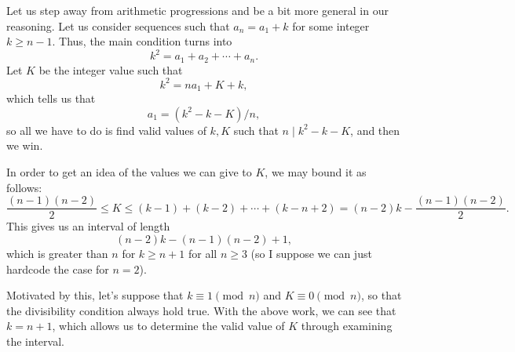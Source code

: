 \documentclass[a4paper, 12pt]{article}
\begin{document}
\begin{solution}
Let us step away from arithmetic progressions and be a bit more general in our reasoning. Let us consider sequences such that \( a_n = a_1 + k \) for some integer \( k \ge n - 1 \). Thus, the main condition turns into
\[
    k^2 = a_1 + a_2 + \cdots + a_n
.\]
Let \( K \) be the integer value such that
\[
    k^2 = n a_1 + K + k
,\]
which tells us that
\[
    a_1 = (k^2 - k - K) / n
,\]
so all we have to do is find valid values of \( k, K \) such that \( n \mid k^2 - k - K \), and then we win.

In order to get an idea of the values we can give to \( K \), we may bound it as follows:
\[
    \frac{(n-1)(n-2)}{2} \le K \le (k - 1) + (k - 2) + \cdots + (k - n + 2) = (n-2)k - \frac{(n-1)(n-2)}{2}
.\]
This gives us an interval of length
\[
    (n-2)k - (n-1)(n-2) + 1
,\]
which is greater than \( n \) for \( k \ge n + 1 \) for all \( n \ge 3 \) (so I suppose we can just hardcode the case for \( n = 2 \)).

Motivated by this, let's suppose that \( k \equiv 1 \pmod{n} \) and \( K \equiv 0 \pmod{n} \), so that the divisibility condition always hold true. With the above work, we can see that \( k = n + 1 \), which allows us to determine the valid value of \( K \) through examining the interval.
\end{solution}
\end{document}
